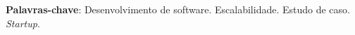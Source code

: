 \begin{resumo}
 \vspace{\onelineskip}
    
 \noindent
  \textbf{Palavras-chave}: Desenvolvimento de software. Escalabilidade.
    Estudo de caso. \textit{Startup}.
\end{resumo}
